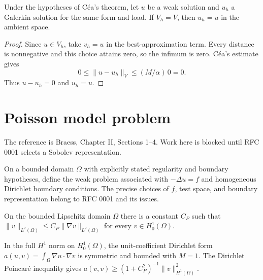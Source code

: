 \begin{corollary}
  \label{cor:galerkin-whole-space}
  Under the hypotheses of C\'ea's theorem, let $u$ be a weak solution and
  $u_h$ a Galerkin solution for the same form and load. If $V_h=V$, then
  $u_h=u$ in the ambient space.
\end{corollary}
\begin{proof}
  Since $u\in V_h$, take $v_h=u$ in the best-approximation term. Every
  distance is nonnegative and this choice attains zero, so the infimum is
  zero. C\'ea's estimate gives
  \[
    0\le \|u-u_h\|_V\le (M/\alpha)\,0=0.
  \]
  Thus $u-u_h=0$ and $u_h=u$.
\end{proof}

\chapter{Poisson model problem}

The reference is Braess, Chapter II, Sections 1--4. Work here is blocked until
RFC 0001 selects a Sobolev representation.

\begin{definition}
  \label{def:poisson-weak}
  \notready
  On a bounded domain $\Omega$ with explicitly stated regularity and boundary
  hypotheses, define the weak problem associated with $-\Delta u=f$ and
  homogeneous Dirichlet boundary conditions. The precise choices of $f$, test
  space, and boundary representation belong to RFC 0001 and its issues.
\end{definition}

\begin{lemma}
  \label{lem:dirichlet-poincare}
  \notready
  On the bounded Lipschitz domain $\Omega$ there is a constant $C_P$ such
  that $\|v\|_{L^2(\Omega)}\le C_P\|\nabla v\|_{L^2(\Omega)}$ for every
  $v\in H_0^1(\Omega)$.
\end{lemma}

\begin{proposition}
  \label{prop:poisson-ellipticity}
  \notready
  In the full $H^1$ norm on $H_0^1(\Omega)$, the unit-coefficient Dirichlet
  form $a(u,v)=\int_\Omega \nabla u\cdot\nabla v$ is symmetric and bounded
  with $M=1$. The Dirichlet Poincaré inequality gives
  $a(v,v)\ge (1+C_P^2)^{-1}\|v\|_{H^1(\Omega)}^2$.
\end{proposition}

